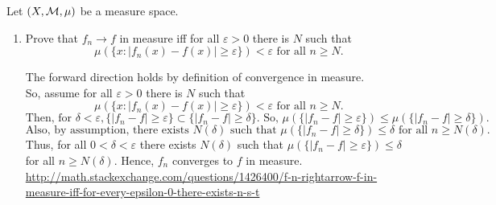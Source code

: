 Let $(X, {\mathcal M}, \mu)$ be a measure space.
\begin{enumerate}
\item 	Prove that $f_n \rightarrow f$ in measure iff for all $\varepsilon>0$ there is $N$ such that 
 \[
 \mu(\{ x: |f_n(x)-f(x)|\geq \varepsilon \})< \varepsilon \text{ for all } n \geq N.
\]
\begin{pf}
The forward direction holds by definition of convergence in measure.\\
So, assume for all $\varepsilon>0$ there is $N$ such that 
 \[
 \mu(\{ x: |f_n(x)-f(x)|\geq \varepsilon \})< \varepsilon \text{ for all } n \geq N.
\]
\[
\text{Then, for } \delta < \varepsilon, \{ |f_n - f| \geq \varepsilon \} \subset \{ |f_n - f|\geq \delta \}. \text{ So, } \mu(\{ |f_n - f| \geq \varepsilon \}) \leq \mu(\{ |f_n - f|\geq \delta \}).
\]
\[
\text{Also, by assumption, there exists } N(\delta) \text{ such that } \mu(\{ |f_n - f|\geq \delta \}) \leq \delta \text{ for all } n \geq N(\delta). 
\]
Thus, for all $0< \delta< \varepsilon$ there exists $N(\delta)$ such that $\mu(\{|f_n - f|\geq \varepsilon\})\leq \delta$ for all $n \geq N(\delta)$. Hence, $f_n$ converges to $f$ in measure. \\
\url{http://math.stackexchange.com/questions/1426400/f-n-rightarrow-f-in-measure-iff-for-every-epsilon-0-there-exists-n-s-t}
\end{pf}


\end{enumerate}
